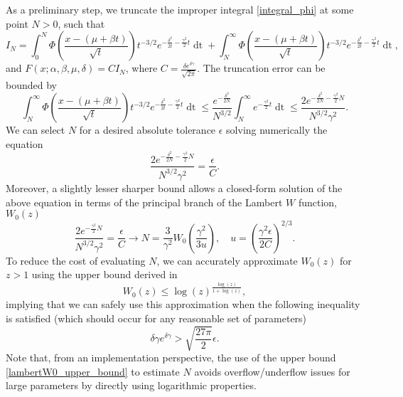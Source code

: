 \documentclass[10pt,a4paper,oneside]{article}
\numberwithin{equation}{section}
\begin{document}
As a preliminary step, we truncate the improper integral \eqref{integral_phi} at some point $N > 0$, such that
\begin{equation}\label{truncated_integral}
I_N = \int_0^N \Phi\left(\frac{x - (\mu +\beta t)}{\sqrt{t}}\right) t^{-3/2} e^{-\frac{\delta^2}{2t} - \frac{\gamma^2}{2}t} \mathop{dt} + \int_N^{\infty} \Phi\left(\frac{x - (\mu +\beta t)}{\sqrt{t}}\right) t^{-3/2} e^{-\frac{\delta^2}{2t} - \frac{\gamma^2}{2}t} \mathop{dt},
\end{equation}
and $F(x; \alpha, \beta, \mu, \delta) = C I_N$, where $C = \frac{\delta e^{\delta \gamma}}{\sqrt{2\pi}}$. The truncation error can be bounded by
\begin{equation}
\int_N^{\infty} \Phi\left(\frac{x - (\mu +\beta t)}{\sqrt{t}}\right) t^{-3/2} e^{-\frac{\delta^2}{2t} - \frac{\gamma^2}{2}t} \mathop{dt} \le \frac{e^{-\frac{\delta^2}{2N}}}{N^{3/2}}\int_N^{\infty} e^{- \frac{\gamma^2}{2}t} \mathop{dt} \le \frac{2 e^{-\frac{\delta^2}{2N} - \frac{\gamma^2}{2}N}}{N^{3/2} \gamma^2}.
\end{equation}
We can select $N$ for a desired absolute tolerance $\epsilon$ solving numerically the equation
\begin{equation}
\frac{2 e^{-\frac{\delta^2}{2N} - \frac{\gamma^2}{2}N}}{N^{3/2} \gamma^2} = \frac{\epsilon}{C}.
\end{equation}
Moreover, a slightly lesser sharper bound allows a closed-form solution of the above equation in terms of the principal branch of the Lambert $W$ function, $W_0(z)$
\begin{equation}\label{N_equation}
\frac{2 e^{- \frac{\gamma^2}{2}N}}{N^{3/2} \gamma^2} = \frac{\epsilon}{C} \longrightarrow N = \frac{3}{\gamma^2}W_0\left(\frac{\gamma^2}{3u}\right), \quad u = \left(\frac{\gamma^2 \epsilon}{2 C}\right)^{2/3}.
\end{equation}
To reduce the cost of evaluating $N$, we can accurately approximate $W_0(z)$ for $z > 1$ using the upper bound derived in \cite{Hoorfar2008}
\begin{equation}\label{lambertW0_upper_bound}
W_0(z) \le \log(z)^{\tfrac{\log(z)}{1 + \log(z)}},
\end{equation}
implying that we can safely use this approximation when the following inequality is satisfied (which should occur for any reasonable set of parameters)
\begin{equation}
\delta \gamma e^{\delta\gamma} > \sqrt{\frac{27 \pi}{2}} \epsilon.
\end{equation}
Note that, from an implementation perspective, the use of the upper bound  \eqref{lambertW0_upper_bound} to estimate $N$ avoids overflow/underflow issues for large parameters by directly using logarithmic properties. 
\end{document}
